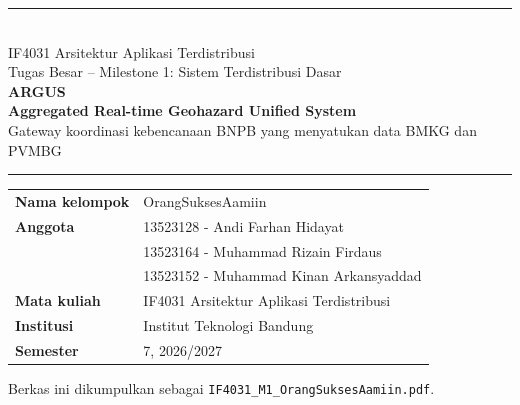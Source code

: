 \documentclass[11pt,a4paper,oneside]{report}
\begin{document}
\begin{titlepage}
\thispagestyle{empty}
\sffamily
\vspace*{1.2cm}
{\color{accent}\rule{\textwidth}{1.6pt}}\\[1.2em]
{\Large IF4031 Arsitektur Aplikasi Terdistribusi}\\[0.4em]
{\large Tugas Besar -- Milestone 1: Sistem Terdistribusi Dasar}\\[2.2em]
{\fontsize{40}{44}\selectfont\bfseries\color{accent} ARGUS}\\[0.5em]
{\Large\bfseries Aggregated Real-time Geohazard Unified System}\\[0.8em]
{\large Gateway koordinasi kebencanaan BNPB yang menyatukan data BMKG dan PVMBG}\\[1.2em]
{\color{accent}\rule{\textwidth}{0.6pt}}

\vspace{2.2cm}
\begin{tabular}{@{}L{3.6cm}L{10cm}@{}}
\textbf{Nama kelompok} & OrangSuksesAamiin\\[0.8em]
\textbf{Anggota} & 13523128 - Andi Farhan Hidayat\\
 & 13523164 - Muhammad Rizain Firdaus\\
 & 13523152 - Muhammad Kinan Arkansyaddad\\[0.8em]
\textbf{Mata kuliah} & IF4031 Arsitektur Aplikasi Terdistribusi\\
\textbf{Institusi} & Institut Teknologi Bandung\\
\textbf{Semester} & 7, 2026/2027
\end{tabular}

\vfill
{\small\color{gridgray}Berkas ini dikumpulkan sebagai \texttt{IF4031\_M1\_OrangSuksesAamiin.pdf}.}
\end{titlepage}

\tableofcontents
\clearpage
{}








\end{document}
